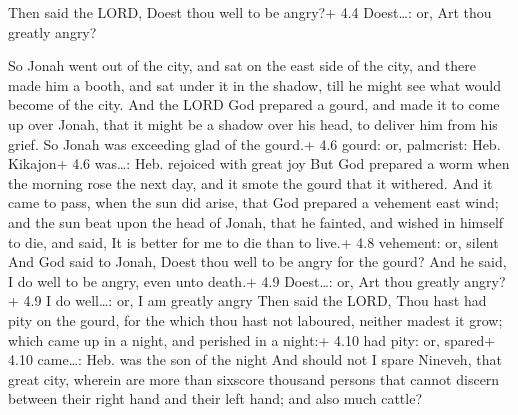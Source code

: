  Then said the LORD, Doest thou well to be angry?+ 4.4
Doest\ldots: or, Art thou greatly angry?

 So Jonah went out of the city, and sat on the east side of
the city, and there made him a booth, and sat under it in the shadow,
till he might see what would become of the city.  And the
LORD God prepared a gourd, and made it to come up over Jonah, that it
might be a shadow over his head, to deliver him from his grief. So Jonah
was exceeding glad of the gourd.+ 4.6 gourd: or, palmcrist: Heb.
Kikajon+ 4.6 was\ldots: Heb. rejoiced with great joy  But
God prepared a worm when the morning rose the next day, and it smote the
gourd that it withered.  And it came to pass, when the sun
did arise, that God prepared a vehement east wind; and the sun beat upon
the head of Jonah, that he fainted, and wished in himself to die, and
said, It is better for me to die than to live.+ 4.8 vehement: or, silent
 And God said to Jonah, Doest thou well to be angry for the
gourd? And he said, I do well to be angry, even unto death.+ 4.9
Doest\ldots: or, Art thou greatly angry?+ 4.9 I do well\ldots: or, I am
greatly angry  Then said the LORD, Thou hast had pity on
the gourd, for the which thou hast not laboured, neither madest it grow;
which came up in a night, and perished in a night:+ 4.10 had pity: or,
spared+ 4.10 came\ldots: Heb. was the son of the night  And
should not I spare Nineveh, that great city, wherein are more than
sixscore thousand persons that cannot discern between their right hand
and their left hand; and also much cattle?
